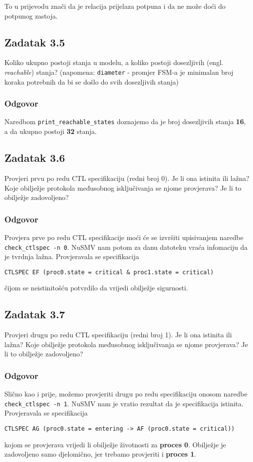 \documentclass{article}
\newcommand{\zadatak}[1]{\subsection{Zadatak #1}}
\newcommand{\odgovor}{\subsubsection*{Odgovor}}
\newcommand{\code}[1]{\colorbox{blue!11}{\texttt{#1}}}
\begin{document}
\noindent
To u prijevodu znači da je relacija prijelaza potpuna i da ne može doći do potpunog zastoja.


\zadatak{3.5}

Koliko ukupno postoji stanja u modelu, a koliko postoji dosezljivih (engl. \textit{reachable}) stanja? (napomena: \code{diameter} - promjer FSM-a je minimalan broj koraka potrebnih da bi se došlo do svih dosezljivih stanja)

\odgovor

Naredbom \code{print\_reachable\_states} doznajemo da je broj dosezljivih stanja \textbf{16}, a da ukupno postoji \textbf{32} stanja.
\pagebreak  %


\zadatak{3.6}

Provjeri prvu po redu CTL specifikaciju (redni broj 0). Je li ona istinita ili lažna? Koje obilježje protokola međusobnog isključivanja se njome provjerava? Je li to obilježje zadovoljeno?

\odgovor

Provjera prve po redu CTL specifikacije moći će se izvršiti upisivanjem naredbe \code{check\_ctlspec -n 0}. NuSMV nam potom za danu datoteku vraća infomaciju da je tvrdnja lažna. Provjeravala se specifikacija

\begin{verbatim}
CTLSPEC EF (proc0.state = critical & proc1.state = critical)
\end{verbatim}

\noindent
čijom se neistinitošću potvrdilo da vrijedi obilježje sigurnosti.


\zadatak{3.7}

Provjeri drugu po redu CTL specifikaciju (redni broj 1). Je li ona istinita ili lažna? Koje obilježje protokola međusobnog isključivanja se njome provjerava? Je li to obilježje zadovoljeno? 

\odgovor

Slično kao i prije, možemo provjeriti drugu po redu specifikaciju onosom naredbe \code{check\_ctlspec -n 1}. NuSMV nam je vratio rezultat da je specifikacija istinita. Provjeravala se specifikacija

\begin{verbatim}
CTLSPEC AG (proc0.state = entering -> AF (proc0.state = critical))
\end{verbatim}

\noindent
kojom se provjerava vrijedi li obilježje životnosti za \textbf{proces 0}. Obilježje je zadovoljeno samo djelomično, jer trebamo provjeriti i \textbf{proces 1}.
\end{document}
